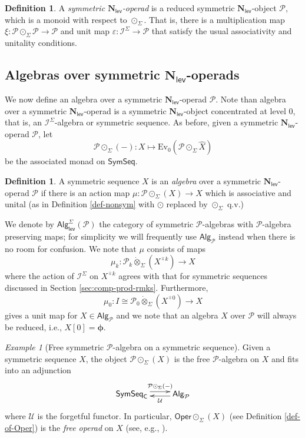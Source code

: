 \documentclass[11pt]{amsart}
\theoremstyle{definition}
\newtheorem{definition}[subsection]{Definition}
\theoremstyle{remark}
\newtheorem{example}[subsection]{Example}
\newcommand{\Alg}[1]{ {\mathsf{Alg}_{\mathcal{#1}}} }
\newcommand{\AlgSym}[1]{\mathsf{Alg}^{\Sigma}_{\mathsf{lev}}\left(\mathcal{#1}\right)}
\newcommand{\SymSeq}{\mathsf{SymSeq}}
\newcommand{\Oper}{\mathsf{Oper}}
\newcommand{\Cal}[1]{\mathcal{#1}}
\newcommand{\circhat}{\hat{\circ}}
\newcommand{\circdot}{{\odot}}
\newcommand{\tensordot}{\dot{\otimes}}
\newcommand{\Nl}{\mathbf{N}_{\mathsf{lev}}}
\newcommand{\Isym}{\Cal{I}^{\Sigma}}
\newcommand{\ptC}{\pmb{\phi}}
\begin{document}
\begin{definition} \label{def:sym-Nl}
    A \textit{symmetric $\Nl$-operad} is a reduced symmetric $\Nl$-object $\Cal{P}$, which is a monoid with respect to $\circdot_{\Sigma}$. That is, there is a multiplication map $\xi\colon \Cal{P}\circdot_{\Sigma}\Cal{P}\to \Cal{P}$ and unit map $\varepsilon \colon \Cal{I}^{\Sigma} \to \Cal{P}$ that satisfy the usual associativity and unitality conditions. 
\end{definition}

\subsection{Algebras over symmetric $\Nl$-operads} \label{sec:algebras}
We now define an algebra over a symmetric $\Nl$-operad $\Cal{P}$. Note than algebra over a symmetric $\Nl$-operad is a symmetric $\Nl$-object concentrated at level $0$, that is, an $\Isym$-algebra or symmetric sequence. As before, given a symmetric $\Nl$-operad $\Cal{P}$, let  \[\Cal{P}\circdot_{\Sigma}(-)\colon X\mapsto \mathrm{Ev}_0(\Cal{P} \circdot_{\Sigma}  \widehat{X})\] be the associated monad on $\SymSeq$.

\begin{definition} 
    A symmetric sequence $X$ is an \textit{algebra} over a symmetric $\Nl$-operad $\Cal{P}$ if there is an action map $\mu\colon \Cal{P}\circdot_{\Sigma} (X) \to X$ which is associative and unital (as in Definition \ref{def-nonsym} with $\circdot$ replaced by $\circdot_{\Sigma}$ q.v.)
\end{definition}

We denote by $\AlgSym{P}$ the category of symmetric $\Cal{P}$-algebras with $\Cal{P}$-algebra preserving maps; for simplicity we will frequently use $\Alg{P}$ instead when there is no room for confusion. We note that $\mu$ consists of maps \[\mu_k \colon \Cal{P}_k \tensordot_{\Sigma} (X^{\circhat k})\to X\] where the action of $\Isym$ on $X^{\circhat k}$ agrees with that for symmetric sequences discussed in Section \ref{sec:comp-prod-rmks}. Furthermore, \[\mu_0\colon I\cong \Cal{P}_0\tensordot_{\Sigma}  (X^{\circhat 0}) \to X\] gives a unit map for $X\in \Alg{P}$ and we note that an algebra $X$ over $\Cal{P}$ will always be reduced, i.e., $X[0]=\ptC$.

\begin{example}[Free symmetric $\Cal{P}$-algebra on a symmetric sequence] 
    Given a symmetric sequence $X$, the object $\Cal{P}\circdot_{\Sigma}(X)$ is the free $\Cal{P}$-algebra on $X$ and fits into an adjunction \[ \xymatrix{ 
        \SymSeq_{\mathsf{C}} \ar@<.75ex>[r]^-{\Cal{P}\circdot_{\Sigma}(-)} 
        & 
        \Alg{P} \ar@<.5ex>[l]^-{\Cal{U}} 
    }\] where $\Cal{U}$ is the forgetful functor. In particular, $\Oper \circdot_{\Sigma}(X)$ (see Definition \ref{def-of-Oper}) is the \textit{free operad} on $X$ (see, e.g.,  \cite[9.4]{AC-1}).
\end{example}
\end{document}
